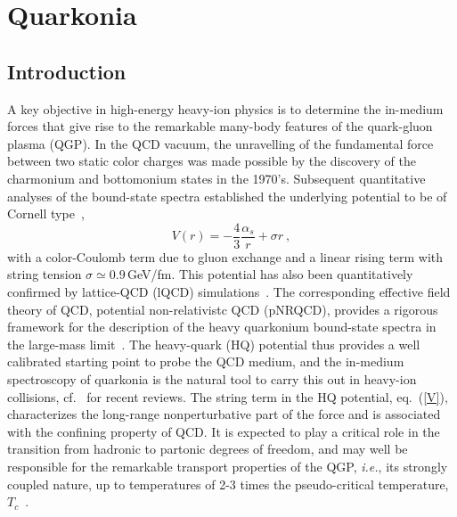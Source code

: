 \documentclass[../report.tex]{subfiles}
\begin{document}
\section{Quarkonia}

\subsection{Introduction}
\label{sec_intro}
A key objective in high-energy heavy-ion physics is to determine the in-medium forces 
that give rise to the remarkable many-body features of the quark-gluon plasma (QGP).
In the QCD vacuum, the unravelling of the fundamental force between two static color charges  
was made possible by the discovery of the charmonium and bottomonium states in the 1970's. 
Subsequent quantitative analyses of the bound-state spectra established the underlying
potential to be of Cornell type~\cite{Eichten:1979ms}, 
\begin{equation}
V(r) = -\frac{4}{3} \frac{\alpha_s}{r} + \sigma r \ ,
\label{V}
\end{equation} 
with a color-Coulomb term due to gluon exchange and a linear rising term with string
tension $\sigma\simeq0.9$\,GeV/fm. This potential has also been quantitatively confirmed 
by lattice-QCD (lQCD) simulations~\cite{Bali:2000gf}. 
The corresponding effective field theory of QCD, potential non-relativistc QCD
(pNRQCD), provides a rigorous framework for the description of the heavy quarkonium
bound-state spectra in the large-mass limit~\cite{Brambilla:2004wf}.
The heavy-quark (HQ) potential thus provides a well calibrated starting point to probe the 
QCD medium, and the in-medium spectroscopy of quarkonia is the natural tool to carry this 
out in heavy-ion collisions, cf.~\cite{Rapp:2008tf,BraunMunzinger:2009ih,Kluberg:2009wc,Mocsy:2013syh,Liu:2015izf} 
for recent reviews.
The string term in the HQ potential, eq.~(\ref{V}), characterizes the long-range nonperturbative 
part of the force and is associated with the confining property of QCD. It is expected to play 
a critical role in the transition from hadronic to partonic degrees of freedom, and may well be 
responsible for the remarkable transport properties of the QGP, {\it i.e.}, its strongly coupled 
nature, up to temperatures of 2-3 times the pseudo-critical temperature, $T_c$~\cite{Liu:2016ysz}. 
\end{document}
